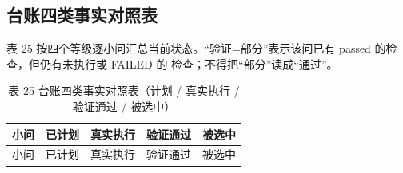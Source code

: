 \documentclass[
  a4paper,12pt]{article}
\begin{document}
\subsection{台账四类事实对照表}\label{ux53f0ux8d26ux56dbux7c7bux4e8bux5b9eux5bf9ux7167ux8868}

表 25 按四个等级逐小问汇总当前状态。``验证=部分''表示该问已有 passed
的检查，但仍有未执行或 FAILED 的 检查；不得把``部分''读成``通过''。

\begin{longtable}[]{@{}
  >{\raggedright\arraybackslash}p{}
  >{\raggedright\arraybackslash}p{}
  >{\raggedright\arraybackslash}p{}
  >{\raggedright\arraybackslash}p{}
  >{\raggedright\arraybackslash}p{}@{}}
\caption{表 25 台账四类事实对照表（计划 / 真实执行 / 验证通过 /
被选中）}\tabularnewline
\toprule\noalign{}
\begin{minipage}[b]{\linewidth}\raggedright
小问
\end{minipage} & \begin{minipage}[b]{\linewidth}\raggedright
已计划
\end{minipage} & \begin{minipage}[b]{\linewidth}\raggedright
真实执行
\end{minipage} & \begin{minipage}[b]{\linewidth}\raggedright
验证通过
\end{minipage} & \begin{minipage}[b]{\linewidth}\raggedright
被选中
\end{minipage} \\
\midrule\noalign{}
\endfirsthead
\toprule\noalign{}
\begin{minipage}[b]{\linewidth}\raggedright
小问
\end{minipage} & \begin{minipage}[b]{\linewidth}\raggedright
已计划
\end{minipage} & \begin{minipage}[b]{\linewidth}\raggedright
真实执行
\end{minipage} & \begin{minipage}[b]{\linewidth}\raggedright
验证通过
\end{minipage} & \begin{minipage}[b]{\linewidth}\raggedright
被选中
\end{minipage} \\

\end{longtable}
\end{document}
